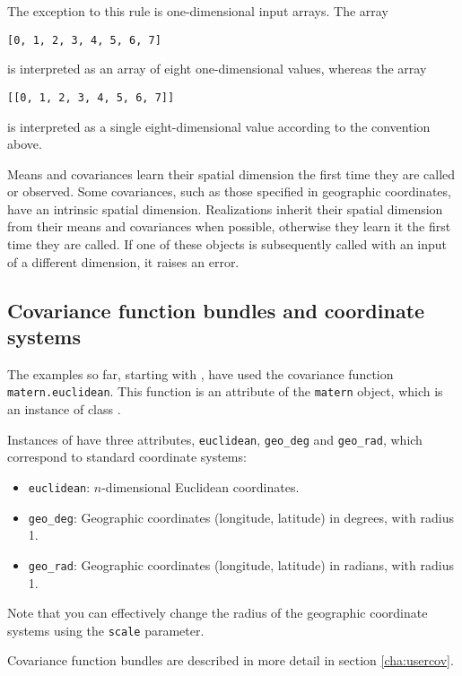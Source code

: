 The exception to this rule is one-dimensional input arrays. The array
\begin{verbatim}
[0, 1, 2, 3, 4, 5, 6, 7]
\end{verbatim}
is interpreted as an array of eight one-dimensional values, whereas the array
\begin{verbatim}
[[0, 1, 2, 3, 4, 5, 6, 7]]
\end{verbatim}
is interpreted as a single eight-dimensional value according to the convention above.

Means and covariances learn their spatial dimension the first time they are called or observed. Some covariances, such as those specified in geographic coordinates, have an intrinsic spatial dimension. Realizations inherit their spatial dimension from their means and covariances when possible, otherwise they learn it the first time they are called. If one of these objects is subsequently called with an input of a different dimension, it raises an error.

\subsection{Covariance function bundles and coordinate systems}
The examples so far, starting with , have used the covariance function \texttt{matern.euclidean}. This function is an attribute of the \texttt{matern} object, which is an instance of class .

Instances of  have three attributes, \texttt{euclidean}, \texttt{geo_deg} and \texttt{geo_rad}, which correspond to standard coordinate systems:
\begin{itemize}
    \item \texttt{euclidean}: $n$-dimensional Euclidean coordinates.
    \item \texttt{geo_deg}: Geographic coordinates (longitude, latitude) in degrees, with radius 1.
    \item \texttt{geo_rad}: Geographic coordinates (longitude, latitude) in radians, with radius 1.
\end{itemize}
Note that you can effectively change the radius of the geographic coordinate systems using the \texttt{scale} parameter.

Covariance function bundles are described in more detail in section \ref{cha:usercov}.

